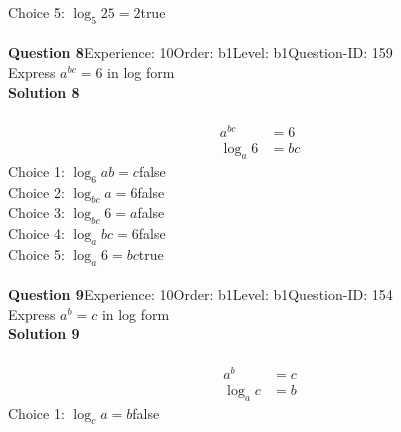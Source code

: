 \documentclass{article}
\begin{document}
Choice 5: \hspace{20pt}$\log_{5}25=2$\hspace{20pt}true\\
\\[4pt]
\noindent\textbf{Question 8}\hspace{20pt}Experience: 10\hspace{20pt}Order: b1\hspace{20pt}Level: b1\hspace{20pt}Question-ID: 159\\[2pt]
Express $a^{bc}=6$ in log form\\[4pt]
\noindent\textbf{Solution 8}\\[2pt]
\\[-35pt]\begin{align*}
a^{bc}&=6\\[2pt]
\log_{a}6&=bc
\end{align*}
Choice 1: \hspace{20pt}$\log_{6}ab=c$\hspace{20pt}false\\
Choice 2: \hspace{20pt}$\log_{bc}a=6$\hspace{20pt}false\\
Choice 3: \hspace{20pt}$\log_{bc}6=a$\hspace{20pt}false\\
Choice 4: \hspace{20pt}$\log_{a}bc=6$\hspace{20pt}false\\
Choice 5: \hspace{20pt}$\log_{a}6=bc$\hspace{20pt}true\\
\\[4pt]
\noindent\textbf{Question 9}\hspace{20pt}Experience: 10\hspace{20pt}Order: b1\hspace{20pt}Level: b1\hspace{20pt}Question-ID: 154\\[2pt]
Express $a^b=c$ in log form\\[4pt]
\noindent\textbf{Solution 9}\\[2pt]
\\[-35pt]\begin{align*}
a^b&=c\\[2pt]
\log_ac&=b
\end{align*}
Choice 1: \hspace{20pt}$\log_ca=b$\hspace{20pt}false\\
\end{document}
